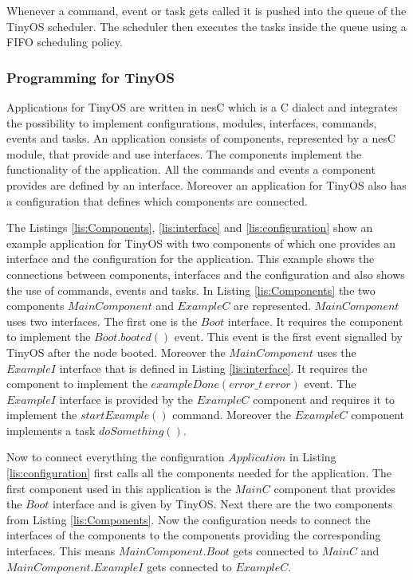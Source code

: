 Whenever a command, event or task gets called it is pushed into the queue of the TinyOS scheduler. The scheduler then executes the tasks inside the queue using a FIFO scheduling policy.    

\subsubsection{Programming for TinyOS}
Applications for TinyOS are written in nesC which is a C dialect and integrates the possibility to implement configurations, modules, interfaces, commands, events and tasks. An application consists of components, represented by a nesC module, that provide and use interfaces. The components implement the functionality of the application. All the commands and events a component provides are defined by an interface. Moreover an application for TinyOS also has a configuration that defines which components are connected.   

The Listings \ref{lis:Components}, \ref{lis:interface} and \ref{lis:configuration} show an example application for TinyOS with two components of which one provides an interface and the configuration for the application. This example shows the connections between components, interfaces and the configuration and also shows the use of commands, events and tasks. In Listing \ref{lis:Components} the two components $MainComponent$ and $ExampleC$ are represented. $MainComponent$ uses two interfaces. The first one is the $Boot$ interface. It requires the component to implement the $Boot.booted()$ event. This event is the first event signalled by TinyOS after the node booted. Moreover the $MainComponent$ uses the $ExampleI$ interface that is defined in Listing \ref{lis:interface}. It requires the component to implement the $exampleDone(error\_t\ error)$ event. The $ExampleI$ interface is provided by the $ExampleC$ component and requires it to implement the $startExample()$ command. Moreover the $ExampleC$ component implements a task $doSomething()$.

Now to connect everything the configuration $Application$ in Listing \ref{lis:configuration} first calls all the components needed for the application. The first component used in this application is the $MainC$ component that provides the $Boot$ interface and is given by TinyOS. Next there are the two components from Listing \ref{lis:Components}. Now the configuration needs to connect the interfaces of the components to the components providing the corresponding interfaces. This means $MainComponent.Boot$ gets connected to $MainC$ and $MainComponent.ExampleI$ gets connected to $ExampleC$.

